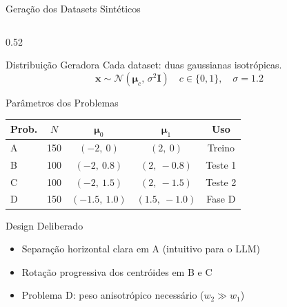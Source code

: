 \documentclass[aspectratio=169, 8pt]{beamer}
\begin{document}
\begin{frame}{Geração dos Datasets Sintéticos}
  \begin{columns}[T]
    \begin{column}{0.52\textwidth}
      \begin{block}{Distribuição Geradora}
        Cada dataset: duas gaussianas isotrópicas.
        \[
          \mathbf{x} \sim \mathcal{N}(\boldsymbol{\mu}_c,\, \sigma^2 \mathbf{I})
          \quad c \in \{0, 1\},\quad \sigma = 1.2
        \]
      \end{block}

      \vspace{0.1em}

      \begin{block}{Parâmetros dos Problemas}
        \footnotesize
        \renewcommand{\arraystretch}{1.3}
        \begin{tabular}{lcccc}
          \toprule
          \textbf{Prob.} & \textbf{$N$} & \textbf{$\boldsymbol{\mu}_0$} & \textbf{$\boldsymbol{\mu}_1$} & \textbf{Uso} \\
          \midrule
          A & 150 & $(-2,\ 0)$     & $(2,\ 0)$      & Treino \\
          B & 100 & $(-2,\ 0.8)$   & $(2,\ {-}0.8)$ & Teste 1 \\
          C & 100 & $(-2,\ 1.5)$   & $(2,\ {-}1.5)$ & Teste 2 \\
          D & 150 & $(-1.5,\ 1.0)$ & $(1.5,\ {-}1.0)$ & Fase D \\
          \bottomrule
        \end{tabular}
      \end{block}

      \vspace{0.1em}
      \begin{exampleblock}{Design Deliberado}
        \begin{itemize}
          \item Separação horizontal clara em A (intuitivo para o LLM)
          \item Rotação progressiva dos centróides em B e C
          \item Problema D: peso anisotrópico necessário ($w_2 \gg w_1$)
        \end{itemize}
      \end{exampleblock}
    \end{column}


\end{columns}
\end{frame}
\end{document}
